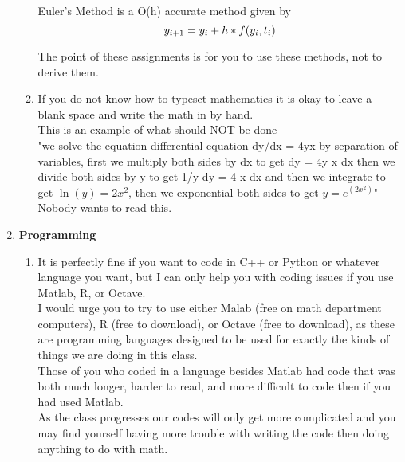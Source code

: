 \documentclass[8pt]{article}
\begin{document}
\begin{enumerate}
\begin{enumerate}
 
 Euler's Method is a O(h) accurate method given by
 \[
 y_{i+1} = y_i + h*f(y_i, t_i)\\ \\
 \]
 
 
 The point of these assignments is for you to use these methods, not to derive them.\\
 
 \item  If you do not know how to typeset mathematics it is okay to leave a blank space and write the math in by hand.\\
 
 This is an example of what should NOT be done\\
 
"we solve the equation differential equation dy/dx = 4yx by separation of variables, first we multiply both sides by dx to get dy = 4y x dx then we divide both sides by y to get 1/y dy = 4 x dx and then we integrate to get $\ln(y) = 2x^2$, then we exponential both sides to get $y = e^(2x^2)$"\\

Nobody wants to read this.\\


\end{enumerate}

\item \textbf{Programming}\\


\begin{enumerate}


\item It is perfectly fine if you want to code in C++ or Python or whatever language you want, but I can only help you with coding issues if you use Matlab, R, or Octave.\\

I would urge you to try to use either Malab (free on math department computers), R (free to download), or Octave (free to download), as these are programming languages designed to be used for exactly the kinds of things we are doing in this class.  \\

Those of you who coded in a language besides Matlab had code that was both much longer, harder to read, and more difficult to code then if you had used Matlab.  \\

As the class progresses our codes will only get more complicated and you may find yourself having more trouble with writing the code then doing anything to do with math.\\


\end{enumerate}
\end{enumerate}
\end{document}
